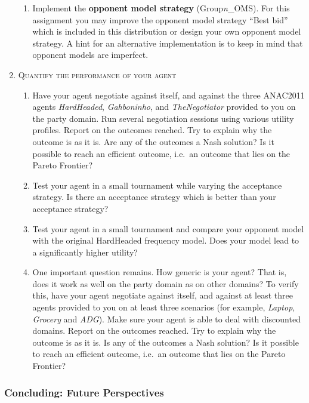 \documentclass[a4paper]{article}
\begin{document}
\begin{enumerate}
\begin{enumerate}
	\item Implement the \textbf{opponent model strategy} (Group\textit{n}\_OMS). For this assignment you may improve the opponent model strategy ``Best bid'' which is included in this distribution or design your own opponent model strategy. A hint for an alternative implementation is to keep in mind that opponent models are imperfect.
  \end{enumerate}

  \item \textsc{Quantify the performance of your agent}
      \begin{enumerate}
        \item Have your agent negotiate against itself, and against the three ANAC2011 agents \textit{HardHeaded}, \textit{Gahboninho}, and \textit{TheNegotiator} provided to you on the party domain. Run several negotiation sessions using various utility profiles. Report on the outcomes reached. Try to explain why the outcome is as it is. Are any of the outcomes a Nash solution? Is it possible to reach an efficient outcome, i.e.\ an outcome that lies on the Pareto Frontier?
	\item Test your agent in a small tournament while varying the acceptance strategy. Is there an acceptance strategy which is better than your acceptance strategy?
	\item Test your agent in a small tournament and compare your opponent model with the original HardHeaded frequency model. Does your model lead to a significantly higher utility?
        \item One important question remains. How generic is your agent? That is, does it work as well on the party domain as on other domains? To verify this, have your agent negotiate against itself, and against at least three agents provided to you on at least three scenarios (for example, {\em Laptop}, \emph{Grocery} and {\em ADG}). Make sure your agent is able to deal with discounted domains. Report on the outcomes reached. Try to explain why the outcome is as it is. Is any of the outcomes a Nash solution? Is it possible to reach an efficient outcome, i.e.\ an outcome that lies on the Pareto Frontier?
      \end{enumerate}
\end{enumerate}


\subsubsection{Concluding: Future Perspectives}
\end{document}
